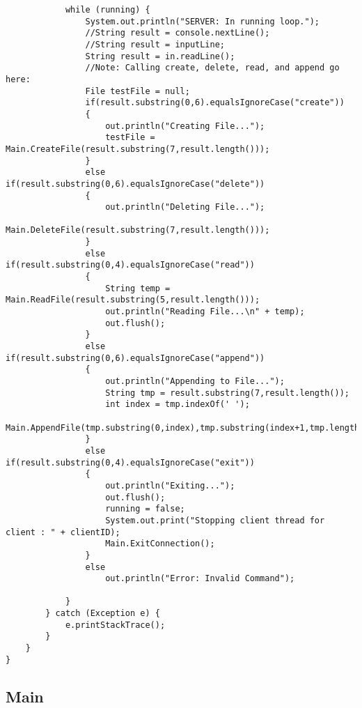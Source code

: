 \documentclass{article}
\begin{document}
\begin{lstlisting}
			while (running) {	
				System.out.println("SERVER: In running loop.");
				//String result = console.nextLine();
				//String result = inputLine;
				String result = in.readLine();
				//Note: Calling create, delete, read, and append go here:
				File testFile = null;
				if(result.substring(0,6).equalsIgnoreCase("create"))
				{
					out.println("Creating File...");
					testFile = Main.CreateFile(result.substring(7,result.length()));
				}
				else if(result.substring(0,6).equalsIgnoreCase("delete"))
				{
					out.println("Deleting File...");
					Main.DeleteFile(result.substring(7,result.length()));
				}
				else if(result.substring(0,4).equalsIgnoreCase("read"))
				{
					String temp = Main.ReadFile(result.substring(5,result.length()));
					out.println("Reading File...\n" + temp);
					out.flush();
				}
				else if(result.substring(0,6).equalsIgnoreCase("append"))
				{
					out.println("Appending to File...");
					String tmp = result.substring(7,result.length());
					int index = tmp.indexOf(' ');
					Main.AppendFile(tmp.substring(0,index),tmp.substring(index+1,tmp.length()));
				}
				else if(result.substring(0,4).equalsIgnoreCase("exit"))
				{
					out.println("Exiting...");
					out.flush();
					running = false;
					System.out.print("Stopping client thread for client : " + clientID);
					Main.ExitConnection();
				}
				else
					out.println("Error: Invalid Command");

			}
		} catch (Exception e) {
			e.printStackTrace();
		}
	}
}
		\end{lstlisting}
		
	\subsection{Main}
\end{document}
